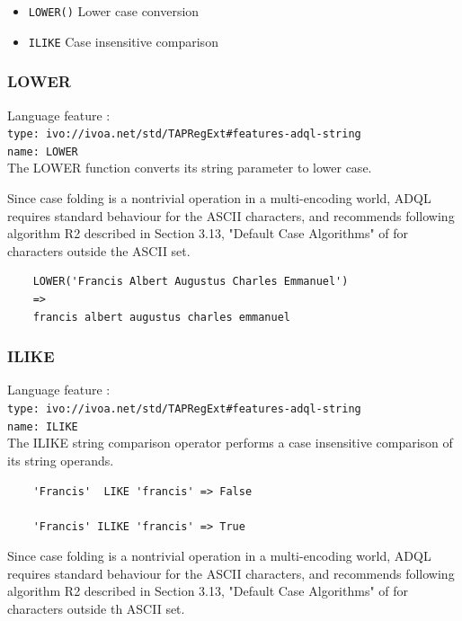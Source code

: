 \documentclass[11pt,a4paper]{ivoa}
\begin{document}
\begin{itemize}
    \item \verb:LOWER(): Lower case conversion
    \item \verb:ILIKE: Case insensitive comparison
\end{itemize}

\subsubsection{LOWER}
\label{sec:string.functions.lower}
{\footnotesize Language feature :}\\
{\footnotesize \verb|type: ivo://ivoa.net/std/TAPRegExt#features-adql-string|}\\
{\footnotesize \verb|name: LOWER|}\\

The LOWER function converts its string parameter to lower case.

Since case folding is a nontrivial operation in a multi-encoding world,
ADQL requires standard behaviour for the ASCII characters, and recommends
following algorithm R2 described in Section 3.13, "Default Case Algorithms"
of \citet{std:UNICODE} for characters outside the ASCII set.

\begin{verbatim}
    LOWER('Francis Albert Augustus Charles Emmanuel')
    =>
    francis albert augustus charles emmanuel
\end{verbatim}

\subsubsection{ILIKE}
\label{sec:string.functions.ilike}
{\footnotesize Language feature :}\\
{\footnotesize \verb|type: ivo://ivoa.net/std/TAPRegExt#features-adql-string|}\\
{\footnotesize \verb|name: ILIKE|}\\

The ILIKE string comparison operator performs a case insensitive comparison
of its string operands.

\begin{verbatim}
    'Francis'  LIKE 'francis' => False

    'Francis' ILIKE 'francis' => True
\end{verbatim}

Since case folding is a nontrivial operation in a multi-encoding world,
ADQL requires standard behaviour for the ASCII characters, and recommends
following algorithm R2 described in Section 3.13, "Default Case Algorithms"
of \citet{std:UNICODE} for characters outside th ASCII set.
\end{document}

